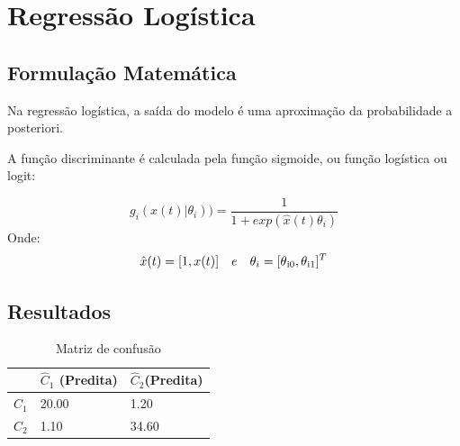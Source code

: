 \documentclass[11pt,a4paper]{article}
\numberwithin{equation}{section}
\begin{document}
\section{Regressão Logística}

\subsection{Formulação Matemática}
Na regressão logística, a saída do modelo é uma aproximação da probabilidade a posteriori.

A função discriminante é calculada pela função sigmoide, ou função logística ou logit:

\[g_i(x(t)|\theta_i))  = \frac{1}{1+ exp(\hat{x}(t)\theta_i)}\]
Onde:
\[\hat{x}(t) = [1,x(t)] \quad e \quad \theta_i=[\theta\textsubscript{i0},\theta\textsubscript{i1}]^T\]

\subsection{Resultados}

\begin{table}[H]
\centering
\caption{Matriz de confusão}
\begin{tabular}{l l l}
\hline
 & \textbf{$\hat{C}_1$ (Predita)} & \textbf{$\hat{C}_2$(Predita)}\\
\hline
$C_1$ & 20.00&1.20\\ 
$C_2$ & 1.10&34.60\\  
\hline
\end{tabular}
\end{table}
\end{document}
